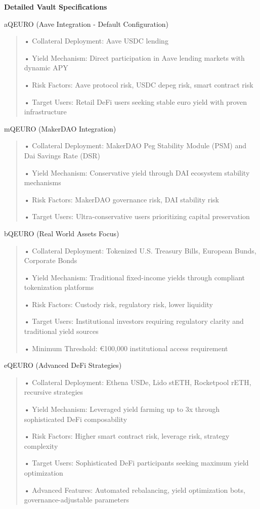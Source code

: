 \textbf{Detailed Vault Specifications}

aQEURO (Aave Integration - Default Configuration)

\begin{quote}
• Collateral Deployment: Aave USDC lending

• Yield Mechanism: Direct participation in Aave lending markets with
dynamic APY

• Risk Factors: Aave protocol risk, USDC depeg risk, smart contract risk

• Target Users: Retail DeFi users seeking stable euro yield with proven
infrastructure
\end{quote}

mQEURO (MakerDAO Integration)

\begin{quote}
• Collateral Deployment: MakerDAO Peg Stability Module (PSM) and Dai
Savings Rate (DSR)

• Yield Mechanism: Conservative yield through DAI ecosystem stability
mechanisms

• Risk Factors: MakerDAO governance risk, DAI stability risk

• Target Users: Ultra-conservative users prioritizing capital
preservation
\end{quote}

bQEURO (Real World Assets Focus)

\begin{quote}
• Collateral Deployment: Tokenized U.S. Treasury Bills, European Bunds,
Corporate Bonds

• Yield Mechanism: Traditional fixed-income yields through compliant
tokenization platforms

• Risk Factors: Custody risk, regulatory risk, lower liquidity

• Target Users: Institutional investors requiring regulatory clarity and
traditional yield sources

• Minimum Threshold: €100,000 institutional access requirement
\end{quote}

eQEURO (Advanced DeFi Strategies)

\begin{quote}
• Collateral Deployment: Ethena USDe, Lido stETH, Rocketpool rETH,
recursive strategies

• Yield Mechanism: Leveraged yield farming up to 3x through
sophisticated DeFi composability

• Risk Factors: Higher smart contract risk, leverage risk, strategy
complexity

• Target Users: Sophisticated DeFi participants seeking maximum yield
optimization

• Advanced Features: Automated rebalancing, yield optimization bots,
governance-adjustable parameters
\end{quote}


